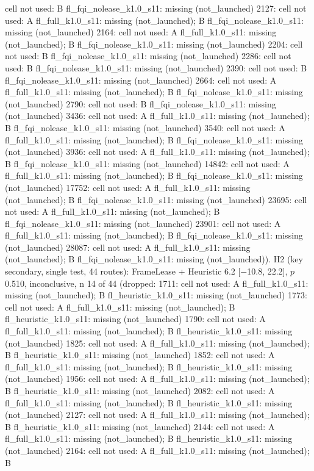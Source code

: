 \begin{table}[t]
{cell not used: B fl\_fqi\_nolease\_k1.0\_s11: missing (not\_launched) \textbar{} 2127: cell not used: A fl\_full\_k1.0\_s11: missing (not\_launched); B fl\_fqi\_nolease\_k1.0\_s11: missing (not\_launched) \textbar{} 2164: cell not used: A fl\_full\_k1.0\_s11: missing (not\_launched); B fl\_fqi\_nolease\_k1.0\_s11: missing (not\_launched) \textbar{} 2204: cell not used: B fl\_fqi\_nolease\_k1.0\_s11: missing (not\_launched) \textbar{} 2286: cell not used: B fl\_fqi\_nolease\_k1.0\_s11: missing (not\_launched) \textbar{} 2390: cell not used: B fl\_fqi\_nolease\_k1.0\_s11: missing (not\_launched) \textbar{} 2664: cell not used: A fl\_full\_k1.0\_s11: missing (not\_launched); B fl\_fqi\_nolease\_k1.0\_s11: missing (not\_launched) \textbar{} 2790: cell not used: B fl\_fqi\_nolease\_k1.0\_s11: missing (not\_launched) \textbar{} 3436: cell not used: A fl\_full\_k1.0\_s11: missing (not\_launched); B fl\_fqi\_nolease\_k1.0\_s11: missing (not\_launched) \textbar{} 3540: cell not used: A fl\_full\_k1.0\_s11: missing (not\_launched); B fl\_fqi\_nolease\_k1.0\_s11: missing (not\_launched) \textbar{} 3936: cell not used: A fl\_full\_k1.0\_s11: missing (not\_launched); B fl\_fqi\_nolease\_k1.0\_s11: missing (not\_launched) \textbar{} 14842: cell not used: A fl\_full\_k1.0\_s11: missing (not\_launched); B fl\_fqi\_nolease\_k1.0\_s11: missing (not\_launched) \textbar{} 17752: cell not used: A fl\_full\_k1.0\_s11: missing (not\_launched); B fl\_fqi\_nolease\_k1.0\_s11: missing (not\_launched) \textbar{} 23695: cell not used: A fl\_full\_k1.0\_s11: missing (not\_launched); B fl\_fqi\_nolease\_k1.0\_s11: missing (not\_launched) \textbar{} 23901: cell not used: A fl\_full\_k1.0\_s11: missing (not\_launched); B fl\_fqi\_nolease\_k1.0\_s11: missing (not\_launched) \textbar{} 28087: cell not used: A fl\_full\_k1.0\_s11: missing (not\_launched); B fl\_fqi\_nolease\_k1.0\_s11: missing (not\_launched)). H2 (key secondary, single test, 44 routes): FrameLease + Heuristic 6.2 [$-$10.8, 22.2], $p$ 0.510, inconclusive, n 14 of 44 (dropped: 1711: cell not used: A fl\_full\_k1.0\_s11: missing (not\_launched); B fl\_heuristic\_k1.0\_s11: missing (not\_launched) \textbar{} 1773: cell not used: A fl\_full\_k1.0\_s11: missing (not\_launched); B fl\_heuristic\_k1.0\_s11: missing (not\_launched) \textbar{} 1790: cell not used: A fl\_full\_k1.0\_s11: missing (not\_launched); B fl\_heuristic\_k1.0\_s11: missing (not\_launched) \textbar{} 1825: cell not used: A fl\_full\_k1.0\_s11: missing (not\_launched); B fl\_heuristic\_k1.0\_s11: missing (not\_launched) \textbar{} 1852: cell not used: A fl\_full\_k1.0\_s11: missing (not\_launched); B fl\_heuristic\_k1.0\_s11: missing (not\_launched) \textbar{} 1956: cell not used: A fl\_full\_k1.0\_s11: missing (not\_launched); B fl\_heuristic\_k1.0\_s11: missing (not\_launched) \textbar{} 2082: cell not used: A fl\_full\_k1.0\_s11: missing (not\_launched); B fl\_heuristic\_k1.0\_s11: missing (not\_launched) \textbar{} 2127: cell not used: A fl\_full\_k1.0\_s11: missing (not\_launched); B fl\_heuristic\_k1.0\_s11: missing (not\_launched) \textbar{} 2144: cell not used: A fl\_full\_k1.0\_s11: missing (not\_launched); B fl\_heuristic\_k1.0\_s11: missing (not\_launched) \textbar{} 2164: cell not used: A fl\_full\_k1.0\_s11: missing (not\_launched); B }
\end{table}
